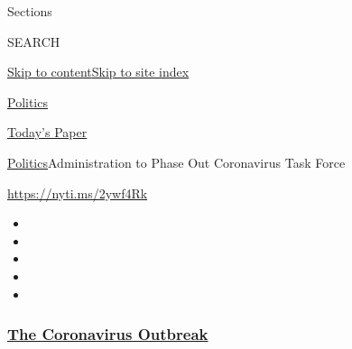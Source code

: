 Sections

SEARCH

\protect\hyperlink{site-content}{Skip to
content}\protect\hyperlink{site-index}{Skip to site index}

\href{https://www.nytimes3xbfgragh.onion/section/politics}{Politics}

\href{https://myaccount.nytimes3xbfgragh.onion/auth/login?response_type=cookie\&client_id=vi}{}

\href{https://www.nytimes3xbfgragh.onion/section/todayspaper}{Today's
Paper}

\href{/section/politics}{Politics}\textbar{}Administration to Phase Out
Coronavirus Task Force

\url{https://nyti.ms/2ywf4Rk}

\begin{itemize}
\item
\item
\item
\item
\item
\end{itemize}

\hypertarget{the-coronavirus-outbreak}{%
\subsubsection{\texorpdfstring{\href{https://www.nytimes3xbfgragh.onion/news-event/coronavirus?name=styln-coronavirus-national\&region=TOP_BANNER\&block=storyline_menu_recirc\&action=click\&pgtype=Article\&impression_id=7d5f0e30-f292-11ea-84d9-09ec1c57291a\&variant=undefined}{The
Coronavirus
Outbreak}}{The Coronavirus Outbreak}}\label{the-coronavirus-outbreak}}

